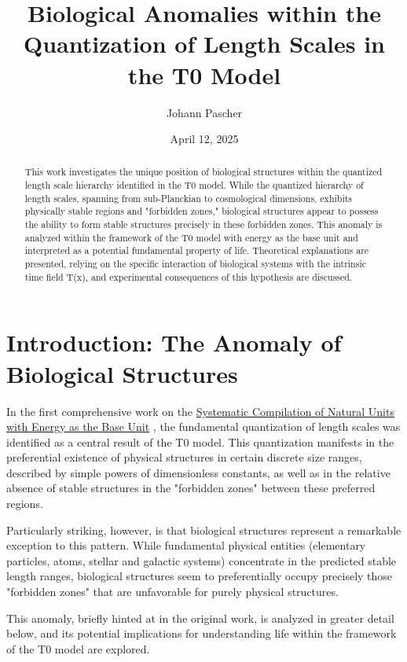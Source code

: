 \documentclass[12pt,a4paper]{article}
\title{Biological Anomalies within the\\Quantization of Length Scales in the T0 Model}
\author{Johann Pascher}
\date{April 12, 2025}
\newcommand{\Tfield}{T(x)}
\begin{document}
	
	\maketitle
	
	\begin{abstract}
		This work investigates the unique position of biological structures within the quantized length scale hierarchy identified in the T0 model. While the quantized hierarchy of length scales, spanning from sub-Planckian to cosmological dimensions, exhibits physically stable regions and "forbidden zones," biological structures appear to possess the ability to form stable structures precisely in these forbidden zones. This anomaly is analyzed within the framework of the T0 model with energy as the base unit and interpreted as a potential fundamental property of life. Theoretical explanations are presented, relying on the specific interaction of biological systems with the intrinsic time field \Tfield, and experimental consequences of this hypothesis are discussed.
	\end{abstract}
	
	\section{Introduction: The Anomaly of Biological Structures}
	\label{sec:introduction}
	
	In the first comprehensive work on the \href{https://github.com/jpascher/T0-Time-Mass-Duality/blob/main/2/pdf/English/NatEinheitenEn.pdf}{Systematic Compilation of Natural Units with Energy as the Base Unit} \cite{pascher_nateinheiten_2025}, the fundamental quantization of length scales was identified as a central result of the T0 model. This quantization manifests in the preferential existence of physical structures in certain discrete size ranges, described by simple powers of dimensionless constants, as well as in the relative absence of stable structures in the "forbidden zones" between these preferred regions.
	
	Particularly striking, however, is that biological structures represent a remarkable exception to this pattern. While fundamental physical entities (elementary particles, atoms, stellar and galactic systems) concentrate in the predicted stable length ranges, biological structures seem to preferentially occupy precisely those "forbidden zones" that are unfavorable for purely physical structures.
	
	This anomaly, briefly hinted at in the original work, is analyzed in greater detail below, and its potential implications for understanding life within the framework of the T0 model are explored.
	
\end{document}
